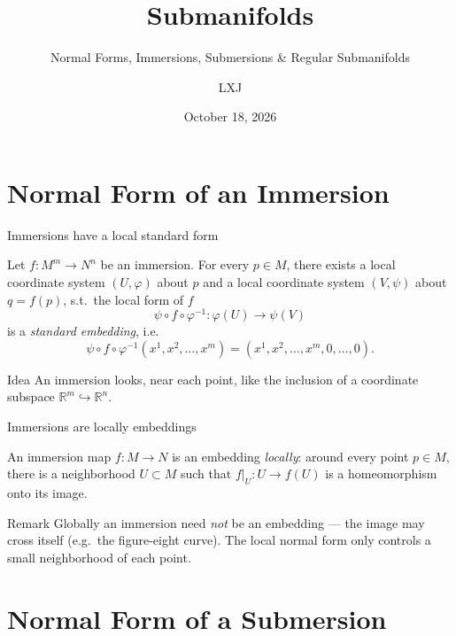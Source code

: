 \documentclass[10pt]{beamer}
\title{Submanifolds}
\subtitle{Normal Forms, Immersions, Submersions \& Regular Submanifolds}
\date{October 18, 2026}
\author{LXJ}
\newcommand{\R}{\mathbb{R}}
\begin{document}
\maketitle

\section{Normal Form of an Immersion}

\begin{frame}{Immersions have a local standard form}
	\begin{theorem}
		Let $f : M^{m} \longrightarrow N^{n}$ be an immersion. For every
		$p \in M$, there exists a local coordinate system $(U, \varphi)$
		about $p$ and a local coordinate system $(V, \psi)$ about
		$q = f(p)$, s.t.\ the local form of $f$
		\[
			\psi \circ f \circ \varphi^{-1} : \varphi(U) \longrightarrow \psi(V)
		\]
		is a \emph{standard embedding}, i.e.
		\[
			\psi \circ f \circ \varphi^{-1}(x^{1}, x^{2}, \dots, x^{m})
			= (x^{1}, x^{2}, \dots, x^{m}, 0, \dots, 0).
		\]
	\end{theorem}
	\begin{block}{Idea}
		An immersion looks, near each point, like the inclusion of a
		coordinate subspace $\R^{m} \hookrightarrow \R^{n}$.
	\end{block}
\end{frame}

\begin{frame}{Immersions are locally embeddings}
	\begin{corollary}
		An immersion map $f : M \longrightarrow N$ is an embedding
		\emph{locally}: around every point $p \in M$, there is a
		neighborhood $U \subset M$ such that $f\big|_{U} : U \to f(U)$
		is a homeomorphism onto its image.
	\end{corollary}
	\medskip
	\begin{block}{Remark}
		Globally an immersion need \emph{not} be an embedding --- the
		image may cross itself (e.g.\ the figure-eight curve). The local
		normal form only controls a small neighborhood of each point.
	\end{block}
\end{frame}

\section{Normal Form of a Submersion}
\end{document}
